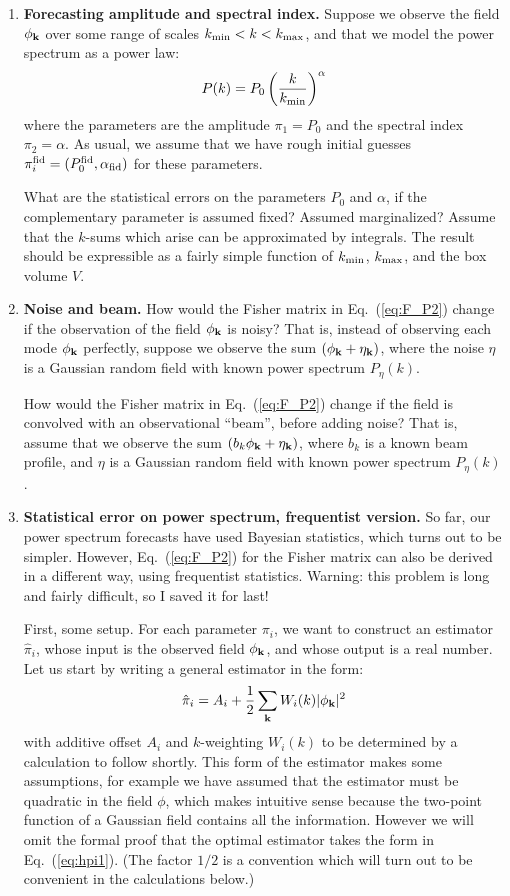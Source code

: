 \documentclass[aps,prd,superscriptaddress,groupedaddress,nofootinbib,nobibnotes]{revtex4}
\newcommand{\be}{\begin{equation}}
\newcommand{\ee}{\end{equation}}
\def\k{{\bf k}}
\def\hpi{{\hat\pi}}
\begin{document}
\begin{enumerate}
\item {\bf Forecasting amplitude and spectral index.}
  Suppose we observe the field $\phi_{\k}$ over some range of scales $k_{\rm min} < k < k_{\rm max}$,
  and that we model the power spectrum as a power law:
\be
  P(k) = P_0 \left( \frac{k}{k_{\rm min}} \right)^\alpha
\ee
  where the parameters are the amplitude $\pi_1 = P_0$ and the spectral index $\pi_2 = \alpha$.
  As usual, we assume that we have rough initial guesses $\pi_i^{\rm fid} = (P_0^{\rm fid}, \alpha_{\rm fid})$
  for these parameters.

  What are the statistical errors on the parameters $P_0$ and $\alpha$, if the complementary parameter
  is assumed fixed?  Assumed marginalized?
  Assume that the $k$-sums which arise can be approximated by integrals.
  The result should be expressible as a fairly simple function of $k_{\rm min}$, $k_{\rm max}$, and the box volume $V$.

\item {\bf Noise and beam.}
  How would the Fisher matrix in Eq.~(\ref{eq:F_P2}) change if the observation of the field $\phi_{\k}$ is noisy?
  That is, instead of observing each mode $\phi_\k$ perfectly, suppose we observe the sum $(\phi_\k + \eta_\k)$, where
  the noise $\eta$ is a Gaussian random field with known power spectrum $P_\eta(k)$.

  How would the Fisher matrix in Eq.~(\ref{eq:F_P2}) change if the field is convolved with an observational ``beam'', before adding noise?
  That is, assume that we observe the sum $(b_k \phi_\k + \eta_\k)$, where $b_k$ is a known beam profile,
  and $\eta$ is a Gaussian random field with known power spectrum $P_\eta(k)$.

\item 
  {\bf Statistical error on power spectrum, frequentist version.}
  So far, our power spectrum forecasts have used Bayesian statistics, which turns out to be simpler.
  However, Eq.~(\ref{eq:F_P2}) for the Fisher matrix can also be derived in a different way, using frequentist statistics.
  Warning: this problem is long and fairly difficult, so I saved it for last!

  First, some setup.
  For each parameter $\pi_i$, we want to construct an estimator $\hpi_i$, whose input is the observed field $\phi_{\k}$,
  and whose output is a real number.  Let us start by writing a general estimator in the form:
\be
  \hpi_i = A_i + \frac{1}{2} \sum_{\k} W_i(k) |\phi_\k|^2  \label{eq:hpi1}
\ee
  with additive offset $A_i$ and $k$-weighting $W_i(k)$ to be determined by a calculation to follow shortly.
  This form of the estimator makes some assumptions, for example we have assumed that the estimator must be quadratic
  in the field $\phi$, which makes intuitive sense because the two-point function of a Gaussian field contains all
  the information.  However we will omit the formal proof that the optimal estimator takes the form in Eq.~(\ref{eq:hpi1}).
  (The factor $1/2$ is a convention which will turn out to be convenient in the calculations below.)


\end{enumerate}
\end{document}
